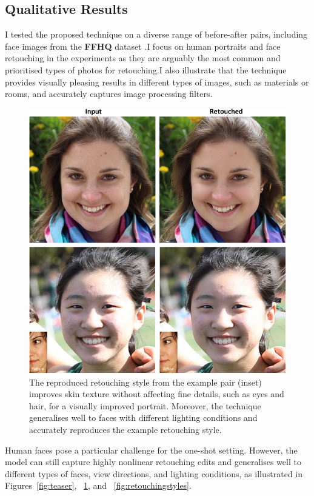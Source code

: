 \subsection{Qualitative Results}
I tested the proposed technique on a diverse range of before-after pairs, including face images from the \textbf{FFHQ} dataset \cite{karras2019style}.I focus on human portraits and face retouching in the experiments as they are arguably the most common and prioritised types of photos for retouching.I also illustrate that the technique provides visually pleasing results in different types of images, such as materials or rooms, and accurately captures image processing filters.

\begin{figure}[th] %
    \centering
	\includegraphics[width=0.8\columnwidth]{Chapters/detail-retouching-figs/res_diff_light_2_cvmp.pdf}
    \caption{\label{fig:newdataset_ex}The reproduced retouching style from the example pair (inset) improves skin texture without affecting fine details, such as eyes and hair, for a visually improved portrait. Moreover, the technique generalises well to faces with different lighting conditions and accurately reproduces the example retouching style.}
 
\end{figure}
Human faces pose a particular challenge for the one-shot setting. However, the model can still capture highly nonlinear retouching edits and generalises well to different types of faces, view directions, and lighting conditions, as illustrated in Figures~\ref{fig:teaser}, ~\ref{fig:newdataset_ex}, and ~\ref{fig:retouchingstyles}.

